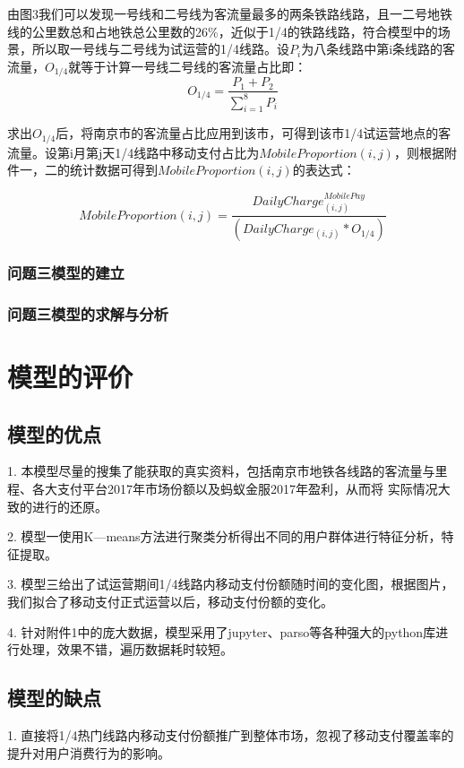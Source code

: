 \documentclass[withoutpreface,bwprint]{cumcmthesis} %
\begin{document}
由图3我们可以发现一号线和二号线为客流量最多的两条铁路线路，且一二号地铁线的公里数总和占地铁总公里数的26\%，近似于1/4的铁路线路，符合模型中的场景，所以取一号线与二号线为试运营的1/4线路。设$P_i$为八条线路中第i条线路的客流量，$O_{1/4}$就等于计算一号线二号线的客流量占比即：
\begin{equation}
O_{1/4}=\frac{P_1+P_2}{\sum_{i=1}^{8}P_i}
\end{equation}

求出$O_{1/4}$后，将南京市的客流量占比应用到该市，可得到该市1/4试运营地点的客流量。设第i月第j天1/4线路中移动支付占比为$MobileProportion(i,j)$，则根据附件一，二的统计数据可得到$MobileProportion(i,j)$的表达式：

\begin{equation}
MobileProportion(i,j)=\frac{DailyCharge^{MobilePay}_{(i,j)}}{(DailyCharge_{(i,j)}*O_{1/4})}
\end{equation}

\subsubsection{问题三模型的建立}


\subsubsection{问题三模型的求解与分析}


\section{模型的评价}
\subsection{模型的优点}
1. 本模型尽量的搜集了能获取的真实资料，包括南京市地铁各线路的客流量与里程、各大支付平台2017年市场份额以及蚂蚁金服2017年盈利，从而将
实际情况大致的进行的还原。  
 
2. 模型一使用K—means方法进行聚类分析得出不同的用户群体进行特征分析，特征提取。   

3. 模型三给出了试运营期间1/4线路内移动支付份额随时间的变化图，根据图片，我们拟合了移动支付正式运营以后，移动支付份额的变化。

4. 针对附件1中的庞大数据，模型采用了jupyter、parso等各种强大的python库进行处理，效果不错，遍历数据耗时较短。
\subsection{模型的缺点}
1. 直接将1/4热门线路内移动支付份额推广到整体市场，忽视了移动支付覆盖率的提升对用户消费行为的影响。
\end{document}
